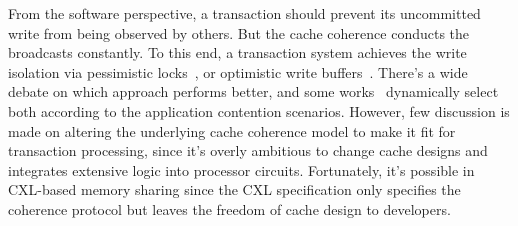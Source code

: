 




From the software perspective, a transaction should prevent its uncommitted write from being observed by others. But the cache coherence conducts the broadcasts constantly. 
To this end, a transaction system achieves the write isolation via pessimistic locks~\cite{s2pl_csur81, abyss_vldb14}, or optimistic write buffers~\cite{silo_sosp13, hekaton_sigmod13, occ_tbs81, farm_nsdi14}. There's a wide debate on which approach performs better, and some works~\cite{tictoc, polyjuice_osdi21, cormcc_atc18} dynamically select both according to the application contention scenarios. However, few discussion is made on altering the underlying cache coherence model to make it fit for transaction processing, since it's overly ambitious to change cache designs and integrates extensive logic into processor circuits. Fortunately, it's possible in CXL-based memory sharing since the CXL specification only specifies the coherence protocol but leaves the freedom of cache design to developers. 
\fi

